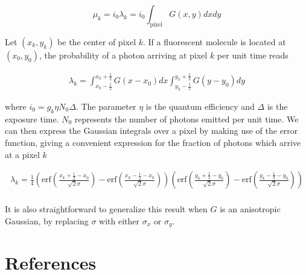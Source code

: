 \documentclass{ucetd}
\begin{document}
\begin{equation}
\mu_{k} = i_{0}\lambda_{k} = i_{0}\int_{\mathrm{pixel}} G(x,y)dxdy
\end{equation}


Let $(x_{k},y_{k})$ be the center of pixel $k$. If a fluorescent molecule is located at $(x_{0},y_{0})$, the probability of a photon arriving at pixel $k$ per unit time reads

\begin{align*}
\lambda_{k} = \int_{x_{k}-\frac{1}{2}}^{x_{k}+\frac{1}{2}}G(x-x_{0})dx \int_{y_{k}-\frac{1}{2}}^{y_{k}+\frac{1}{2}} G(y-y_{0})dy
\end{align*}

where $i_{0} = g_{k}\eta N_{0}\Delta$. The parameter $\eta$ is the quantum efficiency and $\Delta$ is the exposure time. $N_{0}$ represents the number of photons emitted per unit time. We can then express the Gaussian integrals over a pixel by making use of the error function, giving a convenient expression for the fraction of photons which arrive at a pixel $k$

\begin{align*}
\lambda_{k} = \frac{1}{4}\left(\mathrm{erf}\left(\frac{x_{k}+\frac{1}{2}-x_{0}}{\sqrt{2}\sigma}\right) -\mathrm{erf}\left(\frac{x_{k}-\frac{1}{2}-x_{0}}{\sqrt{2}\sigma}\right)\right)\left(\mathrm{erf}\left(\frac{y_{k}+\frac{1}{2}-y_{0}}{\sqrt{2}\sigma}\right) -\mathrm{erf}\left(\frac{y_{k}-\frac{1}{2}-y_{0}}{\sqrt{2}\sigma}\right)\right)\\
\end{align*}

It is also straightforward to generalize this result when $G$ is an anisotropic Gaussian, by replacing $\sigma$ with either $\sigma_{x}$ or $\sigma_{y}$.


\section{References}
\end{document}
